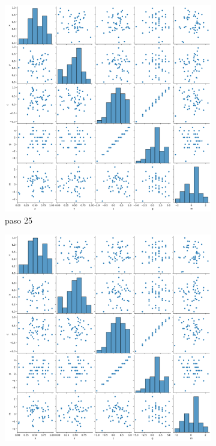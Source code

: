 \documentclass{article}
\begin{document}
\begin{figure}[H]
       \centering
        \begin{subfigure}[b]{0.45\linewidth}
            \includegraphics[width=\linewidth]{tiempsop_t025.png}
            \caption{paso 25}	
            \label{f2.a}
        \end{subfigure}
\begin{subfigure}[b]{0.45\linewidth}
            \includegraphics[width=\linewidth]{tiempsop_t050.png}

\end{subfigure}
\end{figure}
\end{document}
